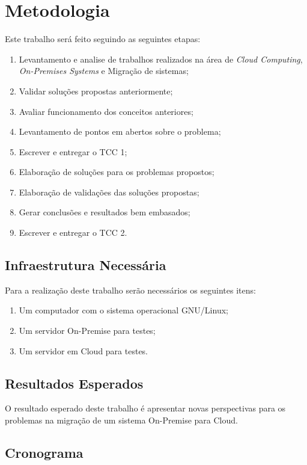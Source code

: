 \chapter{Metodologia}
\label{cap:metodologia}

Este trabalho será feito seguindo as seguintes etapas:

 \begin{enumerate}
   \item Levantamento e analise de trabalhos realizados na área de \textit{Cloud Computing}, \textit{On-Premises Systems} e Migração de sistemas;
   \item Validar soluções propostas anteriormente;
   \item Avaliar funcionamento dos conceitos anteriores;
   \item Levantamento de pontos em abertos sobre o problema;
   \item Escrever e entregar o TCC 1;
   \item Elaboração de soluções para os problemas propostos;
   \item Elaboração de validações das soluções propostas;
   \item Gerar conclusões e resultados bem embasados;
   \item Escrever e entregar o TCC 2.
 \end{enumerate}
 
\section{Infraestrutura Necessária}

Para a realização deste trabalho serão necessários os seguintes itens:

 \begin{enumerate}
   \item Um computador com o sistema operacional GNU/Linux;
   \item Um servidor On-Premise para testes;
   \item Um servidor em Cloud para testes.
 \end{enumerate}

\section{Resultados Esperados}
    O resultado esperado deste trabalho é apresentar novas perspectivas para os problemas na migração de um sistema On-Premise para Cloud.


\section{Cronograma}

